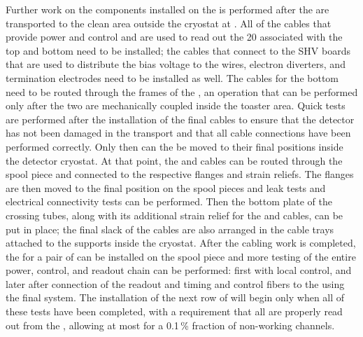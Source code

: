 Further work on the  components installed on the  is performed after
the  are transported to the clean area outside the cryostat at
\surf. All of the cables that provide power and control and are used
to read out the \num{20}  associated with the top and bottom  need to be
installed; the cables that connect to the SHV boards that are used to
distribute the bias voltage to the  wires, electron diverters, and 
termination electrodes need to be installed as well. The cables for the bottom
 need to be routed through the frames of the , an operation that
can be performed only after the two  are mechanically coupled inside
the toaster area. Quick tests are performed after the installation of the
final cables to ensure that the detector has not been damaged in the transport
and that all cable connections have been performed correctly. Only then 
can the  be moved to their final positions inside
the detector cryostat. At that point, the  and  cables can be routed
through the spool piece and connected to the respective flanges and strain
reliefs. The flanges are then moved to the final position on the spool pieces
and leak tests and electrical connectivity tests can be performed. Then the
bottom plate of the crossing tubes, along with its additional strain relief for
the  and  cables, can be put in place; the final slack of the cables
are also arranged in the cable trays attached to the supports inside the cryostat.
After the cabling work is completed, the  for a pair of  can be
installed on the spool piece and more testing of the entire power, control,
and readout chain can be performed: first with local control, and later
after connection of the readout and timing and control fibers to the 
using the final  system. The installation of the next row of  will
begin only when all of these tests have been completed, with a requirement
that all  are properly read out from the , allowing at most for
a \num{0.1}\,\% fraction of non-working channels.


